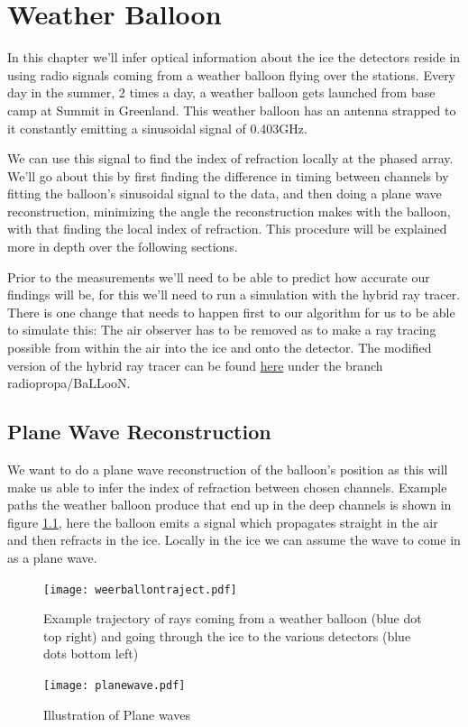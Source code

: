 \chapter{Weather Balloon}
\label{chap:WB}
In this chapter we'll infer optical information about the ice the detectors reside in
using radio signals coming from a weather balloon flying over the stations. 
Every day in the summer, 2 times a day, a weather balloon gets launched
from base camp at Summit in Greenland. This weather balloon has an antenna
strapped to it constantly emitting a sinusoidal signal of 0.403GHz.

We can use this signal to find the index of refraction locally at the phased
array.  We'll go about this by first finding the difference in timing between
channels by fitting the balloon's sinusoidal signal to the data, and then doing
a plane wave reconstruction, minimizing the angle the reconstruction makes with
the balloon, with that finding the local index of refraction.  This procedure will
be explained more in depth over the following sections.

Prior to the measurements we'll need to be able to predict how accurate our
findings will be, for this we'll need to run a simulation with the hybrid ray
tracer.  There is one change that needs to happen first to our algorithm for us
to be able to simulate this: The air observer has to be removed as to make a
ray tracing possible from within the air into the ice and onto the detector.
The modified version of the hybrid ray tracer can be found
\href{https://github.com/arthuradriaens-code/NuRadioMC.git}{here} under the
branch radiopropa/BaLLooN.

\section{Plane Wave Reconstruction}
We want to do a plane wave reconstruction of the balloon's position as this
will make us able to infer the index of refraction between chosen channels.
Example paths the weather balloon produce that end up in the deep channels is
shown in figure \ref{fig:Example trajectory}, here the balloon emits a signal
which propagates straight in the air and then refracts in the ice. Locally in
the ice we can assume the wave to come in as a plane wave.
\begin{figure}
	\centering
	\texttt{[image: weerballontraject.pdf]}
	\caption{Example trajectory of rays coming from a weather balloon (blue dot top right) and going through the ice to the various detectors (blue dots bottom left)}
	\label{fig:Example trajectory}
\end{figure}
\begin{figure}
	\centering
	\texttt{[image: planewave.pdf]}
	\caption{Illustration of Plane waves}	
	\label{fig:Plane Wave}
\end{figure}

